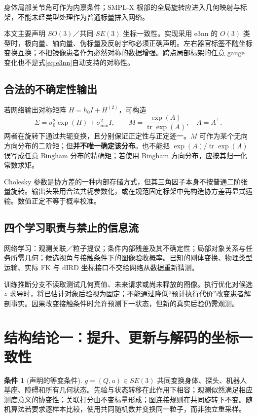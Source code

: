 \documentclass[UTF8,fontset=fandol,11pt,a4paper]{ctexart}
\theoremstyle{plain}
\theoremstyle{definition}
\newtheorem{assumption}[theorem]{条件}
\theoremstyle{remark}
\numberwithin{equation}{section}
\DeclareMathOperator{\tr}{tr}
\begin{document}
身体局部关节角可作为内禀条件；SMPL-X 根部的全局旋转应进入几何映射与标架，不能未经类型处理作为普通标量拼入网络。

本文主要声明 $SO(3)$／共同 $SE(3)$ 坐标一致性。实现采用 e3nn 的 $O(3)$ 类型时，极向量、轴向量、伪标量及反射宇称必须正确声明。左右器官标签不随坐标变换互换；不把镜像患者作为必然对称的数据增强。跨点局部标架的任意 gauge 变化也不是式\eqref{eq:e3nn}自动支持的对称性。

\subsection{合法的不确定性输出}
若网络输出对称矩阵 $H=h_0I+H^{(2)}$，可构造
\begin{equation}
 \Sigma=\sigma_0^2\exp(H)+\sigma_{\min}^2I,\qquad
 M=\frac{\exp(A)}{\tr\exp(A)},\quad A=A^\top.
 \label{eq:positiveheads}
\end{equation}
两者在旋转下通过共轭变换，且分别保证正定性与正定迹一。$M$ 可作为某个无向方向分布的二阶矩；但\textbf{并不唯一确定该分布}。也不能把 $\exp(A)/\tr\exp(A)$ 误写成任意 Bingham 分布的精确矩；若使用 Bingham 方向分布，应按其归一化常数求矩。

Cholesky 参数是协方差的一种内部存储方式，但其三角因子本身不按普通二阶张量旋转。输出头采用合法共轭参数化，或在规范固定标架中先构造协方差再显式运输。数值正定不等于概率校准。

\subsection{四个学习职责与禁止的信息流}
网络学习：观测关联／粒子提议；条件内部残差及其不确定性；局部对象关系与任务所需几何；候选视角与接触条件下的图像验收概率。已知的刚体变换、物理类型运输、实际 FK 与 dIRD 坐标接口不交给网络从数据重新猜测。

训练推断分支不读取测试几何真值、未来请求或尚未释放的图像。执行优化对候选 $z$ 求导时，将已估计对象后验视为固定；不能通过降低“预计执行代价”改变患者解剖事实。因果改变接触条件时允许预测下一状态，但新的真实后验仍需观测。

\section{结构结论一：提升、更新与解码的坐标一致性}
\label{sec:equivariance}
\begin{assumption}[声明的等变条件]
\label{ass:eq}
$g=(Q,a)\in SE(3)$ 共同变换身体、探头、机器人基座、障碍和所有几何状态。先验与状态转移在此作用下相容；观测似然满足相应测度意义的协变性；关联打分由不变标量形成；图连接规则在共同旋转下不变。随机算法若要求逐样本比较，使用共同随机数并变换同一粒子，而非独立重采样。
\end{assumption}
\end{document}
